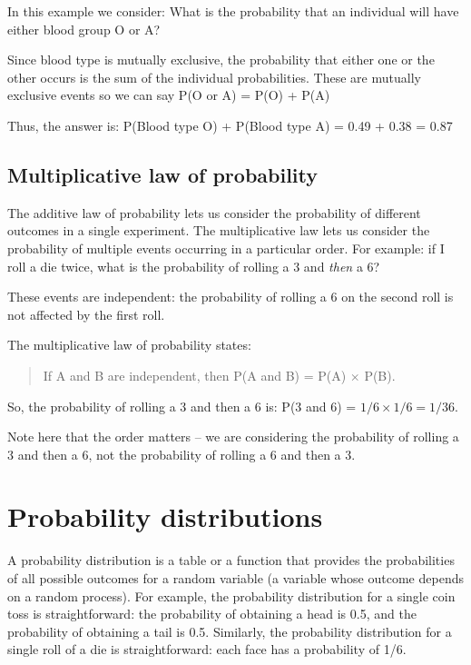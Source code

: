 \documentclass[
]{memoir}
\begin{document}
In this example we consider: What is the probability that an individual will have either blood group O or A?

Since blood type is mutually exclusive, the probability that either one or the other occurs is the sum of the individual probabilities. These are mutually exclusive events so we can say P(O or A) = P(O) + P(A)

Thus, the answer is: P(Blood type O) + P(Blood type A) = 0.49 + 0.38 = 0.87

\hypertarget{multiplicative-law-of-probability}{%
\subsection{Multiplicative law of probability}\label{multiplicative-law-of-probability}}

The additive law of probability lets us consider the probability of different outcomes in a single experiment. The multiplicative law lets us consider the probability of multiple events occurring in a particular order. For example: if I roll a die twice, what is the probability of rolling a 3 and \emph{then} a 6?

These events are independent: the probability of rolling a 6 on the second roll is not affected by the first roll.

The multiplicative law of probability states:

\begin{quote}
If A and B are independent, then P(A and B) = P(A) \(\times\) P(B).
\end{quote}

So, the probability of rolling a 3 and then a 6 is: P(3 and 6) = \(1/6 \times 1/6 = 1/36\).

Note here that the order matters -- we are considering the probability of rolling a 3 and then a 6, not the probability of rolling a 6 and then a 3.

\hypertarget{probability-distributions}{%
\section{Probability distributions}\label{probability-distributions}}

A probability distribution is a table or a function that provides the probabilities of all possible outcomes for a random variable (a variable whose outcome depends on a random process). For example, the probability distribution for a single coin toss is straightforward: the probability of obtaining a head is 0.5, and the probability of obtaining a tail is 0.5. Similarly, the probability distribution for a single roll of a die is straightforward: each face has a probability of 1/6.
\end{document}

